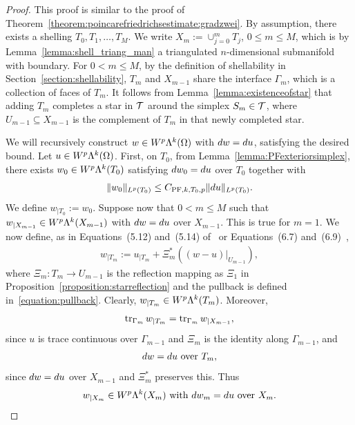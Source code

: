 \documentclass[10pt,a4paper]{article}
\begin{document}
\begin{proof}
    This proof is similar to the proof of Theorem~\ref{theorem:poincarefriedrichsestimate:gradzwei}.
    By assumption, there exists a shelling $T_0, T_1, \dots, T_{M}$. 
    We write $X_m := \cup_{j=0}^{m} T_j$, $0 \leq m \leq M$, which is by Lemma~\ref{lemma:shell_triang_man} a triangulated $n$-dimensional submanifold with boundary. 
    For $0 < m \leq M$, by the definition of shellability in Section~\ref{section:shellability}, 
    $T_{m}$ and $X_{m-1}$ share the interface $\Gamma_{m}$, which is a collection of faces of $T_{m}$. 
    It follows from Lemma~\ref{lemma:existenceofstar} that adding $T_{m}$ completes a star in ${\mathcal T}$ around the simplex $S_{m} \in {\mathcal T}$, 
    where $U_{m-1} \subseteq X_{m-1}$ is the complement of $T_{m}$ in that newly completed star. 
    
    We will recursively construct $w \in W^{p}\Lambda^{k}(\Omega)$ with $d w = d u$, satisfying the desired bound. 
    Let $u \in W^{p}\Lambda^{k}(\Omega)$. 
    First, on $T_0$, from Lemma~\ref{lemma:PFexteriorsimplex}, 
    there exists $w_0 \in W^{p}\Lambda^{k}(T_{0})$ satisfying $d w_0 = d u$ over $T_{0}$ together with 
    \begin{gather*}
        \| w_0 \|_{L^{p}(T_{0})} \leq C_{{{\rm PF}},k,T_{0},p} \| d u \|_{L^{p}(T_{0})}.
    \end{gather*}
    We define $w_{|T_0} := w_0$. 
    Suppose now that $0 < m \leq M$ such that $w_{|X_{m-1}} \in W^{p}\Lambda^{k}(X_{m-1})$ with $d w = d u$ over $X_{m-1}$. 
    This is true for $m = 1$. 
    We now define, as in Equations~(5.12) and~(5.14) of~\cite{ern2020stable} or Equations~(6.7) and~(6.9)~\cite{Chaum_Voh_p_rob_3D_H_curl_24},
    \begin{align} \label{equation:w''_ext_der}
        w_{|T_m} := u_{|T_m} + \Xi_{m}^{\ast}((w - u)|_{U_{m-1}}),
    \end{align}
    where $\Xi_{m} : T_{m} \rightarrow U_{m-1}$ is the reflection mapping
    as $\Xi_{1}$ in Proposition~\ref{proposition:starreflection} and the pullback is defined in~\eqref{equation:pullback}.
    Clearly, $w_{|T_m} \in W^{p}\Lambda^{k}(T_{m})$. Moreover,
    \begin{align*}
        \operatorname{tr}_{\Gamma_{m}} w_{|T_m} = \operatorname{tr}_{\Gamma_{m}} w_{|X_{m-1}},
    \end{align*}
    since $u$ is trace continuous over $\Gamma_{m-1}$ and $\Xi_{m}$ is the identity along $\Gamma_{m-1}$, and
    \begin{align*}
        d w = d u \text{ over } T_m,
    \end{align*}
    since $d w = d u$ over $X_{m-1}$ and $\Xi_{m}^{\ast}$ preserves this. Thus
    \begin{align*}
        w_{|X_{m}} \in W^{p}\Lambda^{k}(X_{m}) \text{ with } d w_{m} = d u \text{ over } X_{m}. 
    \end{align*}
    

\end{proof}
\end{document}
